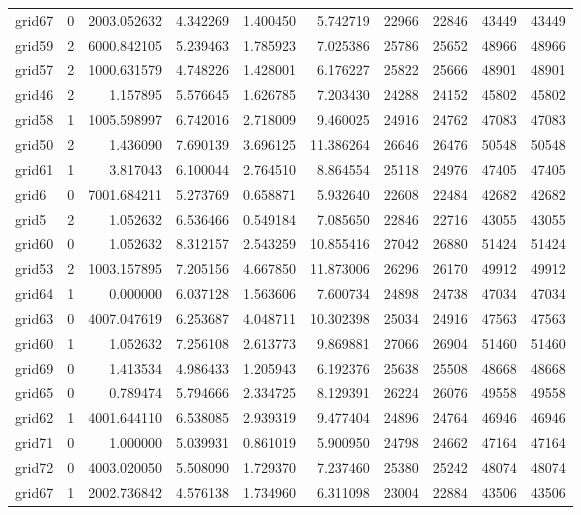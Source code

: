 \begin{longtable}{|l|r|r|r|r|r|r|r|r|r|}
grid67 & 0 & 2003.052632 & 4.342269 & 1.400450 & 5.742719 & 22966 & 22846 & 43449 & 43449 \\
grid59 & 2 & 6000.842105 & 5.239463 & 1.785923 & 7.025386 & 25786 & 25652 & 48966 & 48966 \\
grid57 & 2 & 1000.631579 & 4.748226 & 1.428001 & 6.176227 & 25822 & 25666 & 48901 & 48901 \\
grid46 & 2 & 1.157895 & 5.576645 & 1.626785 & 7.203430 & 24288 & 24152 & 45802 & 45802 \\
grid58 & 1 & 1005.598997 & 6.742016 & 2.718009 & 9.460025 & 24916 & 24762 & 47083 & 47083 \\
grid50 & 2 & 1.436090 & 7.690139 & 3.696125 & 11.386264 & 26646 & 26476 & 50548 & 50548 \\
grid61 & 1 & 3.817043 & 6.100044 & 2.764510 & 8.864554 & 25118 & 24976 & 47405 & 47405 \\
grid6 & 0 & 7001.684211 & 5.273769 & 0.658871 & 5.932640 & 22608 & 22484 & 42682 & 42682 \\
grid5 & 2 & 1.052632 & 6.536466 & 0.549184 & 7.085650 & 22846 & 22716 & 43055 & 43055 \\
grid60 & 0 & 1.052632 & 8.312157 & 2.543259 & 10.855416 & 27042 & 26880 & 51424 & 51424 \\
grid53 & 2 & 1003.157895 & 7.205156 & 4.667850 & 11.873006 & 26296 & 26170 & 49912 & 49912 \\
grid64 & 1 & 0.000000 & 6.037128 & 1.563606 & 7.600734 & 24898 & 24738 & 47034 & 47034 \\
grid63 & 0 & 4007.047619 & 6.253687 & 4.048711 & 10.302398 & 25034 & 24916 & 47563 & 47563 \\
grid60 & 1 & 1.052632 & 7.256108 & 2.613773 & 9.869881 & 27066 & 26904 & 51460 & 51460 \\
grid69 & 0 & 1.413534 & 4.986433 & 1.205943 & 6.192376 & 25638 & 25508 & 48668 & 48668 \\
grid65 & 0 & 0.789474 & 5.794666 & 2.334725 & 8.129391 & 26224 & 26076 & 49558 & 49558 \\
grid62 & 1 & 4001.644110 & 6.538085 & 2.939319 & 9.477404 & 24896 & 24764 & 46946 & 46946 \\
grid71 & 0 & 1.000000 & 5.039931 & 0.861019 & 5.900950 & 24798 & 24662 & 47164 & 47164 \\
grid72 & 0 & 4003.020050 & 5.508090 & 1.729370 & 7.237460 & 25380 & 25242 & 48074 & 48074 \\
grid67 & 1 & 2002.736842 & 4.576138 & 1.734960 & 6.311098 & 23004 & 22884 & 43506 & 43506 \\

\end{longtable}
